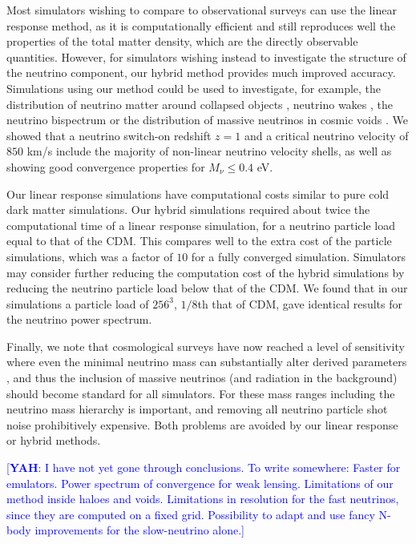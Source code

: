 \documentclass[useAMS, usenatbib]{mnras}
\newcommand{\yah}[1]{{\textcolor{blue}{[{\bf YAH}: #1]}}}
\begin{document}
Most simulators wishing to compare to observational surveys can use the linear response method, as it is computationally efficient and still reproduces well the properties of the total matter density, which are the directly observable quantities. However, for simulators wishing instead to investigate the structure of the neutrino component, our hybrid method provides much improved accuracy. Simulations using our method could be used to investigate, for example, the distribution of neutrino matter around collapsed objects \citep{FVN_2013}, neutrino wakes \citep{Inman_2015}, the neutrino bispectrum \citep{Furhrer_2015} or the distribution of massive neutrinos in cosmic voids \citep{Banerjee_2016}. We showed that a neutrino switch-on redshift $z=1$ and a critical neutrino velocity of $850$ km/s include the majority of non-linear neutrino velocity shells, as well as showing good convergence properties for $M_\nu \leq 0.4$ eV.

Our linear response simulations have computational costs similar to pure cold dark matter simulations. Our hybrid simulations required about twice the computational time of a linear response simulation, for a neutrino particle load equal to that of the CDM. This compares well to the extra cost of the particle simulations, which was a factor of $10$ for a fully converged simulation. Simulators may consider further reducing the computation cost of the hybrid simulations by reducing the neutrino particle load below that of the CDM. We found that in our simulations a particle load of $256^3$, $1/8$th that of CDM, gave identical results for the neutrino power spectrum.

Finally, we note that cosmological surveys have now reached a level of sensitivity where even the minimal neutrino mass can substantially alter derived parameters \citep{Calabrese_2017}, and thus the inclusion of massive neutrinos (and radiation in the background) should become standard for all simulators. For these mass ranges including the neutrino mass hierarchy is important, and removing all neutrino particle shot noise prohibitively expensive. Both problems are avoided by our linear response or hybrid methods.

\yah{I have not yet gone through conclusions. To write somewhere: Faster for emulators. Power spectrum of convergence for weak lensing. Limitations of our method inside haloes and voids. Limitations in resolution for the fast neutrinos, since they are computed on a fixed grid. Possibility to adapt and use fancy N-body improvements for the slow-neutrino alone.}
\end{document}
